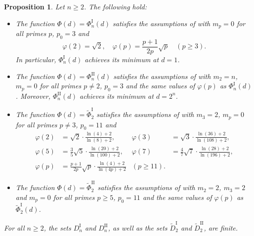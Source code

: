 \documentclass[a4paper]{amsart}
\theoremstyle{definition}
\theoremstyle{plain}
\newtheorem{proposition}[definition]{Proposition}
\newcommand{\I}{\mathrm{I}}
\newcommand{\II}{\mathrm{II}}
\begin{document}
\begin{proposition} \label{prop:long}
    Let \(n\geq 2\). The following hold:
    \begin{itemize}
        \item The function \(\Phi(d) = \Phi_n^\I(d)\) satisfies the assumptions of  with \(m_p = 0\) for all primes \(p\), \(p_0 = 3\) and
        \[
            \varphi(2) = \sqrt{2}, \quad \varphi(p) = \frac{p+1}{2p} \sqrt{p} \quad (p \geq 3).
        \]
        In particular, \(\Phi_n^\I(d)\) achieves its minimum at \(d = 1\). 
        \item The function \(\Phi(d) = \Phi_n^\II(d)\) satisfies the assumptions of  with \(m_2 = n\), \(m_p = 0\) for all primes \(p \neq 2\), \(p_0 = 3\) and the same values of \(\varphi(p)\) as \(\Phi_n^\I(d)\).
        Moreover, \(\Phi_n^\II(d)\) achieves its minimum at \(d = 2^n\). 
        \item The function \(\Phi(d) = \tilde{\Phi}_2^\I\) satisfies the assumptions of  with \(m_3 = 2\), \(m_p = 0\) for all primes \(p \neq 3\), \(p_0 = 11\) and
        \begin{align*}
            \varphi(2) &= \sqrt{2} \cdot \frac{\ln(4)+2}{\ln(8)+2}, & \varphi(3) &= \sqrt{3} \cdot \frac{\ln(36)+2}{\ln(108)+2}, \\ \varphi(5) & = \frac{3}{5} \sqrt{5} \cdot \frac{\ln(20)+2}{\ln(100)+2}, & 
            \varphi(7) & = \frac{4}{7} \sqrt{7} \cdot \frac{\ln(28)+2}{\ln(196)+2},\\
            \varphi(p) &= \frac{p+1}{2p} \sqrt{p} \cdot \frac{\ln(4)+2}{\ln(4p)+2} & (p \geq 11).
        \end{align*}
        \item The function \(\Phi(d) = \tilde{\Phi}_2^\II\) satisfies the assumptions of  with \(m_2 = 2\), \(m_3 = 2\) and \(m_p = 0\) for all primes \(p \geq 5\), \(p_0 = 11\) and the same values of \(\varphi(p)\) as \(\tilde{\Phi}_2^\I(d)\).
    \end{itemize}
    For all \(n \geq 2\), the sets \(D_n^\I\) and \(D_n^\II\), as well as the sets \(\tilde D_2^\I\) and \(\tilde D_2^\II\), are finite.
\end{proposition}
\end{document}
